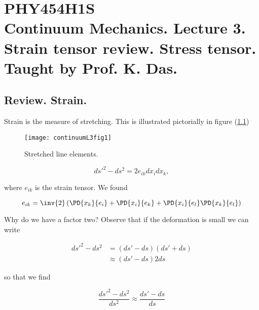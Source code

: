 
%

\chapter{PHY454H1S\\Continuum Mechanics.  Lecture 3.  Strain tensor review.  Stress tensor.  Taught by Prof. K. Das.}
\label{chap:continuumL3}
{}
\date{Jan 18, 2012}

\beginArtWithToc

\section{Review.  Strain.}

Strain is the measure of stretching.  This is illustrated pictorially in figure (\ref{fig:continuumL3:continuumL3fig1})
\begin{figure}[htp]
   \centering
   \texttt{[image: continuumL3fig1]}
   \caption{Stretched line elements.}\label{fig:continuumL3:continuumL3fig1}
\end{figure}

\begin{equation}\label{eqn:continuumL3:10}
{ds'}^2 - ds^2 = 2 e_{ik} dx_i dx_k,
\end{equation}

where $e_{ik}$ is the strain tensor.  We found

\begin{equation}\label{eqn:continuumL3:30}
e_{ik} = \inv{2} \left( 
\PD{x_k}{e_i} 
+\PD{x_i}{e_k} 
+
\PD{x_i}{e_l} 
\PD{x_k}{e_l} 
\right)
\end{equation}

Why do we have a factor two?  Observe that if the deformation is small we can write

\begin{align*}
{ds'}^2 - ds^2 
&= (ds' - ds)(ds' + ds) \\
&\approx
 (ds' - ds) 2 ds
\end{align*}

so that we find 

\begin{equation}\label{eqn:continuumL3:50}
\frac{{ds'}^2 - ds^2 }{ds^2}
\approx
\frac{ds' - ds }{ds}
\end{equation}

